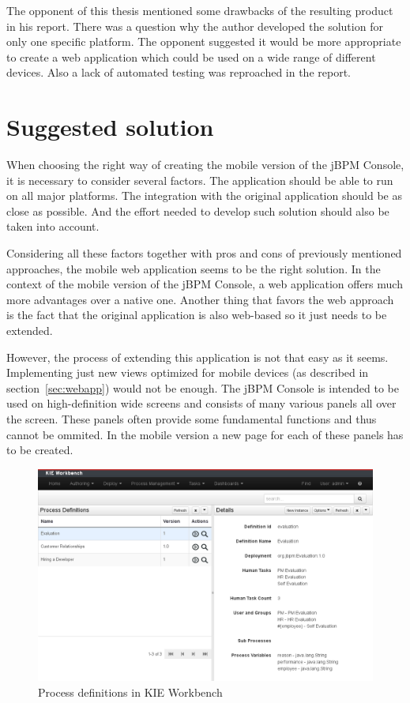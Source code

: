 \documentclass[12pt,oneside,final]{fithesis2}
\begin{document}
The opponent of this thesis mentioned some drawbacks of the resulting product in his report.
There was a question why the author developed the solution for only one specific platform.
The opponent suggested it would be more appropriate to create a web application which could be used on a wide range of different devices.
Also a lack of automated testing was reproached in the report.

\section{Suggested solution}
When choosing the right way of creating the mobile version of the jBPM Console, it is necessary to consider several factors.
The application should be able to run on all major platforms.
The integration with the original application should be as close as possible.
And the effort needed to develop such solution should also be taken into account.

Considering all these factors together with pros and cons of previously mentioned approaches, the mobile web application seems to be the right solution.
In the context of the mobile version of the jBPM Console, a web application offers much more advantages over a native one.
Another thing that favors the web approach is the fact that the original application is also web-based so it just needs to be extended.

However, the process of extending this application is not that easy as it seems.
Implementing just new views optimized for mobile devices (as described in section~\ref{sec:webapp}) would not be enough.
The jBPM Console is intended to be used on high-definition wide screens and consists of many various panels\footnotemark{} all over the screen.
These panels often provide some fundamental functions and thus cannot be ommited.
In the mobile version a new page for each of these panels has to be created.

\begin{figure}[ht!]
\centering
\includegraphics[width=\textwidth]{images/kie-workbench.png}
\caption{Process definitions in KIE Workbench}
\label{fig:kie-workbench}
\end{figure}
\end{document}
